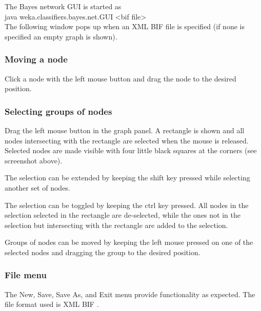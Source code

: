 \documentclass[a4paper]{article}
\begin{document}
The Bayes network GUI is started as\\
java weka.classifiers.bayes.net.GUI <bif file> \\
The following window pops up when an XML BIF file is specified (if none is
specified an empty graph is shown).

\begin{center}
\end{center}


\subsubsection*{Moving a node}
Click a node with the left mouse button and drag the node to the desired position.

\subsubsection*{Selecting groups of nodes}

Drag the left mouse button in the graph panel. A rectangle is shown and
all nodes intersecting with the rectangle are selected when the mouse is
released. Selected nodes are made visible with four little black squares at the 
corners (see screenshot above).

The selection can be extended by keeping the shift key pressed while selecting
another set of nodes.

The selection can be toggled by keeping the ctrl key pressed. All nodes in the
selection selected in the rectangle are de-selected, while the ones not in the
selection but intersecting with the rectangle are added to the selection.

Groups of nodes can be moved by keeping the left mouse pressed on one of the
selected nodes and dragging the group to the desired position.

\subsubsection*{File menu}

\begin{center}
\end{center}

The New, Save, Save As, and Exit menu provide functionality as expected.
The file format used is XML BIF \cite{cozman}.
\end{document}
